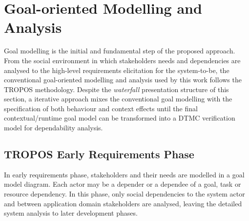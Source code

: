 



\section{Goal-oriented Modelling and Analysis}

Goal modelling is the initial and fundamental step of the proposed approach. From the social environment in which stakeholders needs and dependencies are analysed to the high-level requirements elicitation for the system-to-be, the conventional goal-oriented modelling and analysis used by this work follows the TROPOS methodology. Despite the \textit{waterfall} presentation structure of this section, a iterative approach mixes the conventional goal modelling with the specification of both behaviour and context effects until the final contextual/runtime goal model can be transformed into a DTMC verification model for dependability analysis.


\subsection{TROPOS Early Requirements Phase}

In early requirements phase, stakeholders and their needs are modelled in a goal model diagram. Each actor may be a depender or a dependee of a goal, task or resource dependency. In this phase, only social dependencies to the system actor and between application domain stakeholders are analysed, leaving the detailed system analysis to later development phases.

